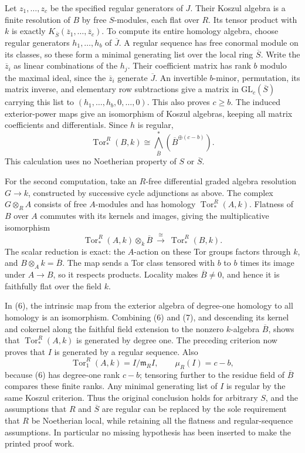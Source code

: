 Let \(z_1,\ldots,z_c\) be the specified regular generators of \(J\). Their Koszul algebra is a finite resolution of \(B\) by free \(S\)-modules, each flat over \(R\). Its tensor product with \(k\) is exactly \(K_{\overline S}(\overline z_1,\ldots,\overline z_c)\). To compute its entire homology algebra, choose regular generators \(h_1,\ldots,h_b\) of \(\overline J\). A regular sequence has free conormal module on its classes, so these form a minimal generating list over the local ring \(\overline S\). Write the \(\overline z_i\) as linear combinations of the \(h_j\). Their coefficient matrix has rank \(b\) modulo the maximal ideal, since the \(\overline z_i\) generate \(\overline J\). An invertible \(b\)-minor, permutation, its matrix inverse, and elementary row subtractions give a matrix in \(\mathrm{GL}_c(\overline S)\) carrying this list to \((h_1,\ldots,h_b,0,\ldots,0)\). This also proves \(c\geq b\). The induced exterior-power maps give an isomorphism of Koszul algebras, keeping all matrix coefficients and differentials. Since \(h\) is regular, \[
\operatorname{Tor}^R_*(B,k)
\cong\bigwedge^*_{\overline B}(\overline B^{\oplus(c-b)}).
\tag{6}
\] This calculation uses no Noetherian property of \(S\) or \(\overline S\).

For the second computation, take an \(R\)-free differential graded algebra resolution \(G\to k\), constructed by successive cycle adjunctions as above. The complex \(G\otimes_R A\) consists of free \(A\)-modules and has homology \(\operatorname{Tor}^R_*(A,k)\). Flatness of \(B\) over \(A\) commutes with its kernels and images, giving the multiplicative isomorphism \[
\operatorname{Tor}^R_*(A,k)\otimes_k\overline B
\ \xrightarrow{\ \cong\ }\ \operatorname{Tor}^R_*(B,k).
\tag{7}
\] The scalar reduction is exact: the \(A\)-action on these Tor groups factors through \(k\), and \(B\otimes_A k=\overline B\). The map sends a Tor class tensored with \(b\) to \(b\) times its image under \(A\to B\), so it respects products. Locality makes \(\overline B\ne0\), and hence it is faithfully flat over the field \(k\).

In (6), the intrinsic map from the exterior algebra of degree-one homology to all homology is an isomorphism. Combining (6) and (7), and descending its kernel and cokernel along the faithful field extension to the nonzero \(k\)-algebra \(\overline B\), shows that \(\operatorname{Tor}^R_*(A,k)\) is generated by degree one. The preceding criterion now proves that \(I\) is generated by a regular sequence. Also \[
\operatorname{Tor}^R_1(A,k)=I/\mathfrak m_RI,
\qquad \mu_R(I)=c-b,
\] because (6) has degree-one rank \(c-b\); tensoring further to the residue field of \(\overline B\) compares these finite ranks. Any minimal generating list of \(I\) is regular by the same Koszul criterion. Thus the original conclusion holds for arbitrary \(S\), and the assumptions that \(R\) and \(\overline S\) are regular can be replaced by the sole requirement that \(R\) be Noetherian local, while retaining all the flatness and regular-sequence assumptions. In particular no missing hypothesis has been inserted to make the printed proof work.

